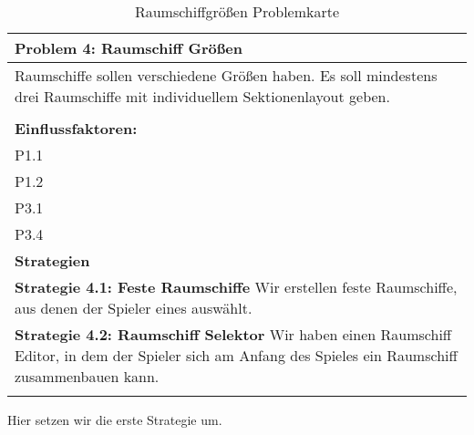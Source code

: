 \documentclass[fontsize=12pt,paper=a4,twoside]{scrartcl}
\begin{document}
\begin{table}[H]
    \centering
    \begin{tabular}{|p{15cm}|}
    \hline
          \textbf{Problem 4: Raumschiff Größen}  \\ \hline
	Raumschiffe sollen verschiedene Größen haben. Es soll mindestens drei Raumschiffe mit individuellem Sektionenlayout geben. \\
         \\ \hline
          \textbf{Einflussfaktoren: } \\
	P1.1 \\
	P1.2 \\
	P3.1 \\
	P3.4 \\
          \hline
          \textbf{Strategien} \\ \hline
            {}          
           \label{strategie:4.1}     
          \textbf{Strategie 4.1: Feste Raumschiffe} Wir erstellen feste Raumschiffe, aus denen der Spieler eines auswählt. \\        
  {}          
           \label{strategie:4.2}              
          \textbf{Strategie 4.2: Raumschiff Selektor} Wir haben einen Raumschiff Editor, in dem der Spieler sich am Anfang des Spieles ein Raumschiff zusammenbauen kann. \\
	 \\ \hline
    \end{tabular}

    \caption{Raumschiffgrößen Problemkarte}
    \label{tab:ProblemKarte4}
\end{table}
Hier setzen wir die erste Strategie um. \\
\end{document}
